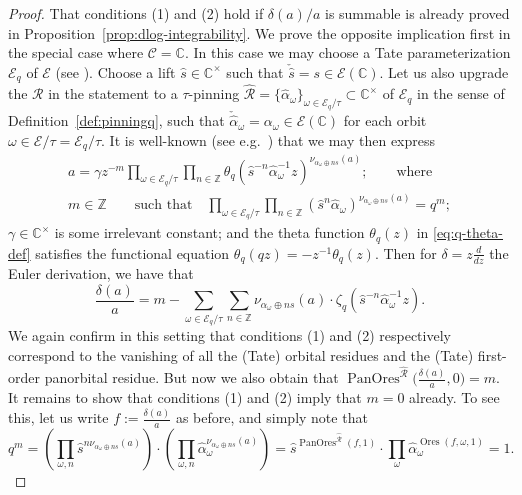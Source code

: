 \documentclass[preprint,12pt]{elsarticle}
\numberwithin{equation}{section} %
\theoremstyle{theorem}
\theoremstyle{definition}
\newcommand{\Ca}{\mathcal{C}} %
\newcommand{\ec}{\mathcal{E}} %
\newcommand{\ecq}{\ec_{q}}
\newcommand{\orbitq}{{\ecq/\tau}} %
\newcommand{\orbita}{{\ec/\tau}} %
\newcommand{\C}{\mathbb{C}} %
\newcommand{\Z}{\mathbb{Z}} %
\newcommand{\zq}{\zeta_{q}}
\DeclareMathOperator{\ores}{Ores}
\DeclareMathOperator{\pano}{PanOres}
\begin{document}
        \begin{proof} That conditions (1) and (2) hold if $\delta(a)/a$ is summable is already proved in Proposition~\ref{prop:dlog-integrability}. We prove the opposite implication first in the special case where $\Ca=\C$. In this case we may choose a Tate parameterization $\ecq$ of $\ec$ (see \cite[\S V.1]{silvermanAdvanced}). Choose a lift $\hat{s}\in\C^\times$ such that $\check{\hat{s}}=s\in\ec(\C)$. Let us also upgrade the $\mathcal{R}$ in the statement to a $\tau$-pinning $\hat{\mathcal{R}}=\{\hat{\alpha}_\omega\}_{\omega\in\orbitq}\subset\C^\times$ of $\ecq$ in the sense of Definition~\ref{def:pinningq}, such that $\check{\hat{\alpha}}_\omega=\alpha_\omega\in\ec(\C)$ for each orbit $\omega\in\orbita=\orbitq$. It is well-known (see e.g.~\cite[p.~14]{Roquette}) that we may then express \begin{equation}\label{eq:theta-expansion}
        \begin{gathered}
            a=\gamma
            z^{-m}\prod_{\omega\in\orbitq}\prod_{n\in\Z}\theta_q(\hat{s}^{-n}\hat{\alpha}_\omega^{-1}z)^{\nu_{\alpha_\omega\oplus ns}(a)};\qquad \text{where} \\
             m\in\Z \qquad\text{such that}\quad
            \prod_{\omega\in\orbitq}\prod_{n\in\Z}(\hat{s}^n\hat{\alpha}_\omega)^{\nu_{\alpha_\omega\oplus ns}(a)}=q^m;
            \end{gathered}
        \end{equation} $\gamma\in\C^\times$ is some irrelevant constant; and the theta function $\theta_q(z)$ in \eqref{eq:q-theta-def} satisfies the functional equation $\theta_q(qz)=-z^{-1}\theta_q(z)$. Then for $\delta=z\frac{d}{dz}$ the Euler derivation, we have that \[\frac{\delta(a)}{a}=m-\sum_{\omega\in\orbitq}\sum_{n\in\Z}\nu_{\alpha_\omega\oplus ns}(a)\cdot\zq(\hat{s}^{-n}\hat{\alpha}_\omega^{-1}z).\] We again confirm in this setting that conditions (1) and (2) respectively correspond to the vanishing of all the (Tate) orbital residues and the (Tate) first-order panorbital residue. But now we also obtain that $\pano^{\hat{\mathcal{R}}}\bigl(\frac{\delta(a)}{a},0\bigr)=m$. It remains to show that conditions (1) and (2) imply that $m=0$ already. To see this, let us write $f:=\frac{\delta(a)}{a}$ as before, and simply note that \[q^m=\left(\prod_{\omega,n}\hat{s}^{n\nu_{\alpha_\omega\oplus ns}(a)}\right)\cdot\left(\prod_{\omega,n}\hat{\alpha}_\omega^{\nu_{\alpha_\omega\oplus ns}(a)}\right)=\hat{s}^{\pano^{\hat{\mathcal{R}}}(f,1)}\cdot\prod_{\omega}\hat{\alpha}_\omega^{\ores(f,\omega,1)}=1.\]
        

\end{proof}
\end{document}
